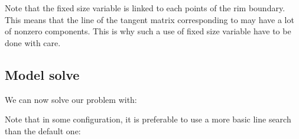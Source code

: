 \documentclass[a4paper,11pt,english]{sphinxmanual}
\begin{document}
\begin{sphinxVerbatim}[commandchars=\\\{\}]
 
\end{sphinxVerbatim}

Note that the fixed size variable  is linked to each points of the rim boundary. This means that the line of the tangent matrix corresponding to  may have a lot of nonzero components. This is why such a use of fixed size variable have to be done with care.


\subsection{Model solve}
\label{\detokenize{tutorial/wheel:model-solve}}
We can now solve our problem with:

\begin{sphinxVerbatim}[commandchars=\\\{\}]
    
\end{sphinxVerbatim}

Note that in some configuration, it is preferable to use a more basic line search than the default one:

\begin{sphinxVerbatim}[commandchars=\\\{\}]
         
\end{sphinxVerbatim}
\end{document}

